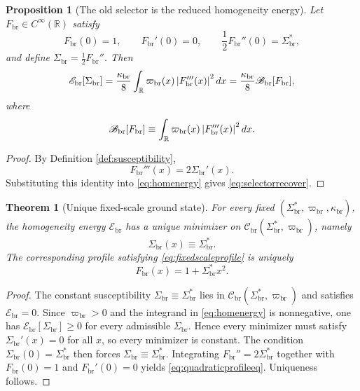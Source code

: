\documentclass[11pt]{article}
\newcommand{\CurvProfile}{F_{\mathrm{br}}}
\newcommand{\ProfWeight}{\varpi_{\mathrm{br}}}
\newcommand{\ProfBend}{\mathscr B_{\mathrm{br}}}
\newcommand{\RespSus}{\Sigma_{\mathrm{br}}}
\newcommand{\RespSusEq}{\Sigma_{\mathrm{br}}^{\ast}}
\newcommand{\RespClass}{\mathscr C_{\mathrm{br}}}
\newcommand{\RespEnergy}{\mathscr E_{\mathrm{br}}}
\newcommand{\RespStiff}{\kappa_{\mathrm{br}}}
\newtheorem{proposition}{Proposition}
\newtheorem{theorem}{Theorem}
\begin{document}
\begin{proposition}[The old selector is the reduced homogeneity energy]
\label{prop:recoverselector}
Let \(\CurvProfile\in C^\infty(\mathbb R)\) satisfy
\begin{equation}
\CurvProfile(0)=1,
\qquad
\CurvProfile'(0)=0,
\qquad
\frac12\CurvProfile''(0)=\RespSusEq,
\label{eq:fixedscaleprofile}
\end{equation}
and define \(\RespSus=\frac12\CurvProfile''\). Then
\begin{equation}
\RespEnergy[\RespSus]
=
\frac{\RespStiff}{8}\int_{\mathbb R}\ProfWeight(x)\,\abs{\CurvProfile'''(x)}^2\,dx
=
\frac{\RespStiff}{8}\ProfBend[\CurvProfile],
\label{eq:selectorrecover}
\end{equation}
where
\begin{equation}
\ProfBend[\CurvProfile]
\equiv
\int_{\mathbb R}\ProfWeight(x)\,\abs{\CurvProfile'''(x)}^2\,dx.
\label{eq:oldbending}
\end{equation}
\end{proposition}

\begin{proof}
By Definition \ref{def:susceptibility},
\[
\CurvProfile'''(x)=2\RespSus'(x).
\]
Substituting this identity into \eqref{eq:homenergy} gives \eqref{eq:selectorrecover}.
\end{proof}

\begin{theorem}[Unique fixed-scale ground state]
\label{thm:fixedscale}
For every fixed \((\RespSusEq,\ProfWeight,\RespStiff)\), the homogeneity energy \(\RespEnergy\) has a unique minimizer on \(\RespClass(\RespSusEq,\ProfWeight)\), namely
\begin{equation}
\RespSus(x)\equiv \RespSusEq.
\label{eq:constantsigma}
\end{equation}
The corresponding profile satisfying \eqref{eq:fixedscaleprofile} is uniquely
\begin{equation}
\CurvProfile(x)=1+\RespSusEq x^2.
\label{eq:quadraticprofileeq}
\end{equation}
\end{theorem}

\begin{proof}
The constant susceptibility \(\RespSus\equiv\RespSusEq\) lies in \(\RespClass(\RespSusEq,\ProfWeight)\) and satisfies \(\RespEnergy=0\). Since \(\ProfWeight>0\) and the integrand in \eqref{eq:homenergy} is nonnegative, one has \(\RespEnergy[\RespSus]\geq0\) for every admissible \(\RespSus\). Hence every minimizer must satisfy \(\RespSus'(x)=0\) for all \(x\), so every minimizer is constant. The condition \(\RespSus(0)=\RespSusEq\) then forces \(\RespSus\equiv\RespSusEq\). Integrating \(\CurvProfile''=2\RespSusEq\) together with \(\CurvProfile(0)=1\) and \(\CurvProfile'(0)=0\) yields \eqref{eq:quadraticprofileeq}. Uniqueness follows.
\end{proof}
\end{document}
